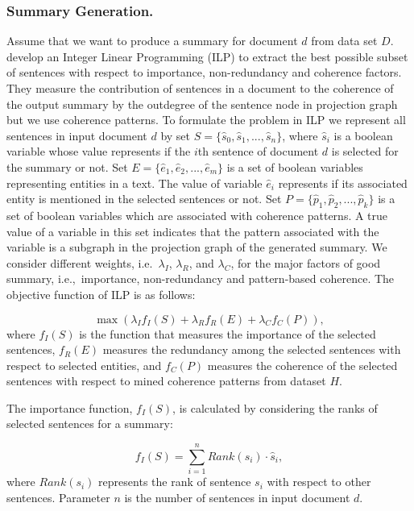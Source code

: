 \subsubsection{Summary Generation.}
Assume that we want to produce a summary for document $d$ from data set $D$. 
 develop an Integer Linear Programming (ILP) to extract the best possible subset of sentences with respect to importance, non-redundancy and coherence factors. 
They measure the contribution of sentences in a document to the coherence of the output summary by the outdegree of the sentence node in projection graph but we use coherence patterns. 
To formulate the problem in ILP we represent all sentences in input document $d$ by set 
$S = \lbrace \hat{s}_0, \hat{s}_1,..., \hat{s}_n \rbrace$, where $\hat{s}_i$ is a boolean variable whose value represents if the $i$th sentence of document $d$ is selected for the summary or not.  
Set $E=\lbrace \hat{e}_1, \hat{e}_2,..., \hat{e}_m \rbrace$ is a set of boolean variables representing entities in a text. 
The value of variable $\hat{e}_i$ represents if its associated entity is mentioned in the selected sentences or not. 
Set $P= \lbrace \hat{p}_1, \hat{p}_2,..., \hat{p}_k \rbrace$ is a set of boolean variables which are associated with coherence patterns. 
A true value of a variable in this set indicates that the pattern associated with the variable is a subgraph in the projection graph of the generated summary. 
We consider different weights, i.e.\ $\lambda_I$, $\lambda_R$, and $\lambda_C$, for the major factors of good summary, i.e.,\ importance, non-redundancy and pattern-based coherence.  
The objective function of ILP is as follows:

\begin{equation}
\max(\lambda_I f_I(S) + \lambda_R f_R(E) + \lambda_C f_C(P)),
\end{equation}
where $f_I(S)$ is the function that measures the importance of the selected sentences, $f_R(E)$ measures the redundancy among the selected sentences with respect to selected entities, and $f_C(P)$ measures the coherence of the selected sentences with respect to mined coherence patterns from dataset $H$. 

The importance function, $f_I(S)$, is calculated by considering the ranks of selected sentences for a summary:

\begin{equation}
f_I(S) = \sum_{i=1}^{n}{Rank(s_i) \cdot \hat{s}_i},
\end{equation}
where $Rank(s_i)$ represents the rank of sentence $s_i$ with respect to other sentences. 
Parameter $n$ is the number of sentences in input document $d$.  

